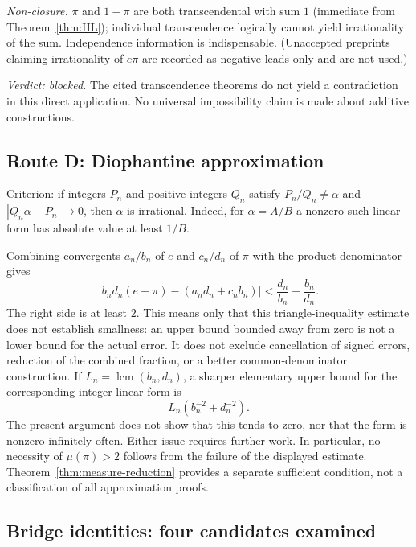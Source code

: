 \documentclass[11pt]{amsart}
\theoremstyle{definition}
\theoremstyle{remark}
\numberwithin{equation}{section}
\newcommand{\irr}{\mu}
\newcommand{\ee}{e}
\begin{document}
\emph{Non-closure.} $\pi$ and $1-\pi$ are both transcendental with sum $1$ (immediate from Theorem~\ref{thm:HL}); individual transcendence logically cannot yield irrationality of the sum. Independence information is indispensable. (Unaccepted preprints claiming irrationality of $e\pi$ \cite{CarellaEpi} are recorded as negative leads only and are not used.)

\emph{Verdict: blocked.} The cited transcendence theorems do not yield a contradiction in this direct application. No universal impossibility claim is made about additive constructions.

\subsection{Route D: Diophantine approximation}

Criterion: if integers $P_n$ and positive integers $Q_n$ satisfy $P_n/Q_n\ne\alpha$ and $|Q_n\alpha-P_n|\to0$, then $\alpha$ is irrational. Indeed, for $\alpha=A/B$ a nonzero such linear form has absolute value at least $1/B$.

Combining convergents $a_n/b_n$ of $\ee$ and $c_n/d_n$ of $\pi$ with the product denominator gives
\[
\left|b_nd_n(e+\pi)-(a_nd_n+c_nb_n)\right|
<\frac{d_n}{b_n}+\frac{b_n}{d_n}.
\]
The right side is at least $2$. This means only that this triangle-inequality estimate does not establish smallness: an upper bound bounded away from zero is not a lower bound for the actual error. It does not exclude cancellation of signed errors, reduction of the combined fraction, or a better common-denominator construction. If $L_n=\operatorname{lcm}(b_n,d_n)$, a sharper elementary upper bound for the corresponding integer linear form is
\[
L_n\left(b_n^{-2}+d_n^{-2}\right).
\]
The present argument does not show that this tends to zero, nor that the form is nonzero infinitely often. Either issue requires further work. In particular, no necessity of $\irr(\pi)>2$ follows from the failure of the displayed estimate. Theorem~\ref{thm:measure-reduction} provides a separate sufficient condition, not a classification of all approximation proofs.

\subsection{Bridge identities: four candidates examined}
\end{document}
